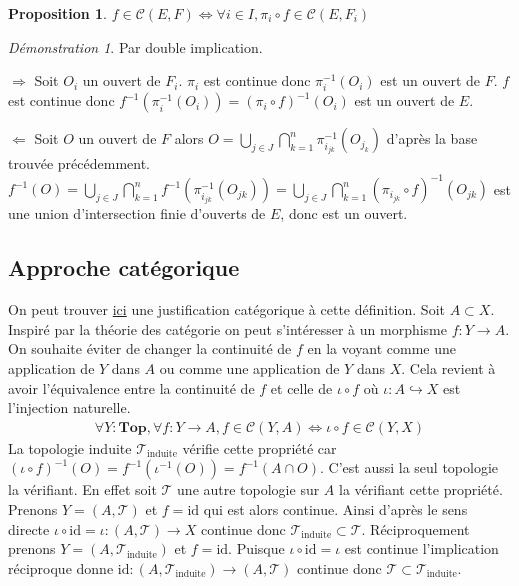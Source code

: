 \documentclass[a4paper, 11pt, french]{book}
\newenvironment{centre}{\center}{\endcenter}
\newenvironment{itemise}{\itemize}{\enditemize}
\theoremstyle{plain} %
\newtheorem{proposition}{Proposition}
\theoremstyle{definition} %
\theoremstyle{remark} %
\newtheorem*{demonstration}{Démonstration}
\newcommand{\1}{\mathds{1}}
\newcommand{\id}{\mathrm{id}}
\newcommand{\inv}[1]{#1^{-1}}
\renewcommand{\cal}[1]{\mathcal{#1}}
\newcommand{\scr}[1]{\mathscr{#1}}
\newcommand\equivalence[3]{
	\begin{demonstration}
		#1
		\begin{itemise}
			\item[$\Longrightarrow$] #2
			\item[$\Longleftarrow$] #3
		\end{itemise}
	\end{demonstration}
}
\begin{document}
\begin{proposition}
	$f\in\cal{C}(E, F)\iff\forall i\in I, \pi_i\circ f\in\cal{C}(E, F_i)$
\end{proposition}

\equivalence{Par double implication.}{
	Soit $O_i$ un ouvert de $F_i$.
		$\pi_i$ est continue donc $\inv{\pi_i}(O_i)$ est un ouvert de $F$.
		$f$ est continue donc $\inv{f}(\inv{\pi_i}(O_i))=\inv{(\pi_i\circ f)}(O_i)$ est un ouvert de $E$.
}{
	Soit $O$ un ouvert de $F$ alors $O=\bigcup_{j\in J}\bigcap_{k=1}^n\inv{\pi_{i_{jk}}}(O_{j_k})$ d'après la base trouvée précédemment.
		$\inv{f}(O)=\bigcup_{j\in J}\bigcap_{k=1}^n\inv{f}(\inv{\pi_{i_{jk}}}(O_{jk}))=\bigcup_{j\in J}\bigcap_{k=1}^n\inv{(\pi_{i_{jk}}\circ f)}(O_{jk})$ est une union d'intersection finie d'ouverts de $E$, donc est un ouvert.
}

\subsection{Approche catégorique}

On peut trouver \href{https://www.youtube.com/watch?v=xMmQrqdOkwI}{ici} une justification catégorique à cette définition.
Soit $A\subset X$.
Inspiré par la théorie des catégorie on peut s'intéresser à un morphisme $f\colon Y\rightarrow A$.
On souhaite éviter de changer la continuité de $f$ en la voyant comme une application de $Y$ dans $A$ ou comme une application de $Y$ dans $X$.
Cela revient à avoir l'équivalence entre la continuité de $f$ et celle de $\iota\circ f$ où $\iota\colon A\hookrightarrow X$ est l'injection naturelle.
\begin{align*}
\forall Y\colon\mathbf{Top}, \forall f\colon Y\rightarrow A, f\in\mathcal{C}(Y, A)\iff \iota\circ f\in\mathcal{C}(Y, X)
\end{align*}
La topologie induite $\scr{T}_\text{induite}$ vérifie cette propriété car $(\iota\circ f)^{-1}(O)=f^{-1}(\iota^{-1}(O))=f^{-1}(A\cap O)$.
C'est aussi la seul topologie la vérifiant.
En effet soit $\scr{T}$ une autre topologie sur $A$ la vérifiant cette propriété.
Prenons $Y=(A, \scr{T})$ et $f=\id$ qui est alors continue.
Ainsi d'après le sens directe $\iota\circ\id=\iota\colon(A, \scr{T})\rightarrow X$ continue donc $\scr{T}_\text{induite}\subset\scr{T}$.
Réciproquement prenons $Y=(A, \scr{T}_\text{induite})$ et $f=\id$.
Puisque $\iota\circ\id=\iota$ est continue l'implication réciproque donne $\id\colon(A, \scr{T}_\text{induite})\rightarrow(A, \scr{T})$ continue donc $\scr{T}\subset\scr{T}_\text{induite}$.
\end{document}

